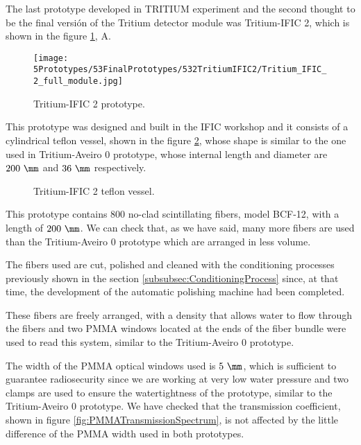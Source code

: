 The last prototype developed in TRITIUM experiment and the second thought to be the final versión of the Tritium detector module was Tritium-IFIC 2, which is shown in the figure \ref{fig:TritiumIFIC2}, A.

\begin{figure}[h]
\centering
\texttt{[image: 5Prototypes/53FinalPrototypes/532TritiumIFIC2/Tritium\_IFIC\_2\_full\_module.jpg]}
\caption{Tritium-IFIC 2 prototype.\label{fig:TritiumIFIC2}}
\end{figure}

This prototype was designed and built in the IFIC workshop and it consists of a cylindrical teflon vessel, shown in the figure \ref{fig:Tritium-IFIC2_vessels}, whose shape is similar to the one used in Tritium-Aveiro 0 prototype, whose internal length and diameter are $200~\mm$ and $36~\mm$ respectively.

\begin{figure}[h]
 \centering
 \caption{Tritium-IFIC 2 teflon vessel.}
 \label{fig:Tritium-IFIC2_vessels}
\end{figure}

This prototype contains $800$ no-clad scintillating fibers, model BCF-12, with a length of $200~\mm$. We can check that, as we have said, many more fibers are used than the Tritium-Aveiro 0 prototype which are arranged in less volume.

The fibers used are cut, polished and cleaned with the conditioning processes previously shown in the section \ref{subsubsec:ConditioningProcess} since, at that time, the development of the automatic polishing machine had been completed.

These fibers are freely arranged, with a density that allows water to flow through the fibers and two PMMA windows located at the ends of the fiber bundle were used to read this system, similar to the Tritium-Aveiro 0 prototype. 

The width of the PMMA optical windows used is $5~\mm$, which is sufficient to guarantee radiosecurity since we are working at very low water pressure  and two clamps are used to ensure the watertightness of the prototype, similar to the Tritium-Aveiro 0 prototype. We have checked that the transmission coefficient, shown in figure \ref{fig:PMMATransmissionSpectrum}, is not affected by the little difference of the PMMA width used in both prototypes.

